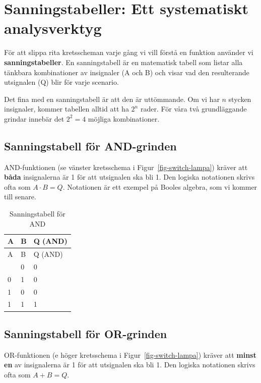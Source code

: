 \documentclass[
  swedish,
  letterpaper,
  oneside,
  openany]{book}
\begin{document}
\section{Sanningstabeller: Ett systematiskt
analysverktyg}\label{sanningstabeller-ett-systematiskt-analysverktyg}

För att slippa rita kretsscheman varje gång vi vill förstå en funktion
använder vi \textbf{sanningstabeller}. En sanningstabell är en
matematisk tabell som listar alla tänkbara kombinationer av insignaler
(A och B) och visar vad den resulterande utsignalen (Q) blir för varje
scenario.

Det fina med en sanningstabell är att den är uttömmande. Om vi har \(n\)
stycken insignaler, kommer tabellen alltid att ha \(2^n\) rader. För
våra två grundläggande grindar innebär det \(2^2 = 4\) möjliga
kombinationer.

\subsection{Sanningstabell för
AND-grinden}\label{sanningstabell-fuxf6r-and-grinden}

AND-funktionen (se vänster kretsschema i Figur~\ref{fig-switch-lampa})
kräver att \textbf{båda} insignalerna är 1 för att utsignalen ska bli 1.
Den logiska notationen skrivs ofta som \(A \cdot B = Q\). Notationen är
ett exempel på Booles algebra, som vi kommer till senare.

\begin{longtable}[]{@{}lll@{}}
\caption{Sanningstabell för AND}\label{tbl-and}\tabularnewline
\toprule\noalign{}
A & B & Q (AND) \\
\midrule\noalign{}
\endfirsthead
\toprule\noalign{}
A & B & Q (AND) \\
\midrule\noalign{}
\endhead
\bottomrule\noalign{}
\endlastfoot
0 & 0 & 0 \\
0 & 1 & 0 \\
1 & 0 & 0 \\
1 & 1 & 1 \\
\end{longtable}

\subsection{Sanningstabell för OR-grinden}\label{sec-logiska-grindar}

OR-funktionen (e höger kretsschema i Figur~\ref{fig-switch-lampa})
kräver att \textbf{minst en} av insignalerna är 1 för att utsignalen ska
bli 1. Den logiska notationen skrivs ofta som \(A + B = Q\).
\end{document}
